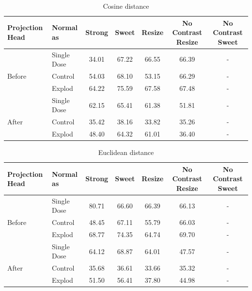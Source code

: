 \begin{table}[H]
  \centering
  \begin{tabular}{@{}llccccc@{}}
  \toprule
  Projection Head & Normal as       & Strong & Sweet & Resize & No Contrast Resize & No Contrast Sweet \\ \midrule
                  & Single Dose    & 34.01      & 67.22     & 66.55      & 66.39                  & -                 \\
  Before          & Control        & 54.03      & 68.10     & 53.15      & 66.29                  & -                 \\
                  & Explod         & 64.22      & 75.59     & 67.58      & 67.48                  & -                 \\ \midrule
                  & Single Dose    & 62.15      & 65.41     & 61.38      & 51.81                  & -                 \\
  After           & Control        & 35.42      & 38.16    & 33.82      & 35.26                  & -                 \\
                  & Explod         & 48.40      & 64.32     & 61.01      & 36.40                  & -                 \\ \bottomrule
  \end{tabular}
  \caption{Cosine distance}
  \label{tab:table_label}
\end{table}

\begin{table}[H]
  \centering
  \begin{tabular}{@{}llccccc@{}}
  \toprule
  Projection Head & Normal as       & Strong & Sweet & Resize & No Contrast Resize & No Contrast Sweet \\ \midrule
                  & Single Dose    & 80.71      & 66.60     & 66.39      & 66.13                  & -                 \\
  Before          & Control        & 48.45      & 67.11     & 55.79      & 66.03                  & -                 \\
                  & Explod         & 68.77      & 74.35     & 64.74      & 69.70                  & -                 \\ \midrule
                  & Single Dose    & 64.12      & 68.87     & 64.01      & 47.57                  & -                 \\
  After           & Control        & 35.68      & 36.61     & 33.66      & 35.32                  & -                 \\
                  & Explod         & 51.50      & 56.41     & 37.80      & 44.98                  & -                 \\ \bottomrule
  \end{tabular}
  \caption{Euclidean distance}
  \label{tab:table_label}
\end{table}

